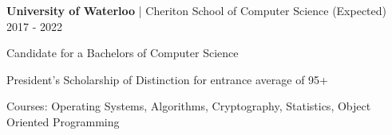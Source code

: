 


\begin{cventries}


\cventry
{\textbf{University of Waterloo} | Cheriton School of Computer Science}
{(Expected) 2017 - 2022}
{ %
\begin{cvitems}
\item {Candidate for a Bachelors of Computer Science}
\item {President’s Scholarship of Distinction for entrance average of 95+}
\item {Courses: Operating Systems, Algorithms, Cryptography, Statistics, Object Oriented Programming}
\end{cvitems}
}


\end{cventries}